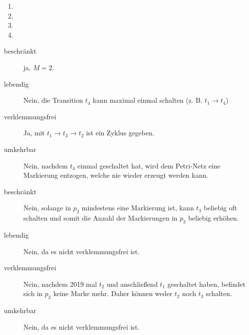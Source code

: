 \documentclass{lehramt-informatik-aufgabe}
\begin{document}
\begin{enumerate}
\item {}
\item {}
\item {}
\item {}

\end{enumerate}

\begin{antwort}


\tikzset{/petri/.cd,x=2,y=2,scale=0.45}

\noindent
{}
%
%
%

\begin{description}
\item[beschränkt] ja, $M = 2$.

\item[lebendig] Nein, die Transition $t_4$ kann maximal einmal schalten
(z. B. $t_1 \rightarrow t_4$)

\item[verklemmungsfrei] Ja, mit $t_1 \rightarrow t_3 \rightarrow  t_2$
ist ein Zyklus gegeben.

\item[umkehrbar] Nein, nachdem $t_4$ einmal geschaltet hat, wird dem
Petri-Netz eine Markierung entzogen, welche nie wieder erzeugt werden
kann.
\end{description}


\begin{description}
\item[beschränkt] Nein, solange in $p_2$ mindestens eine Markierung ist,
kann $t_3$ beliebig oft schalten und somit die Anzahl der Markierungen
in $p_3$ beliebig erhöhen.

\item[lebendig] Nein, da es nicht verklemmungsfrei ist.

\item[verklemmungsfrei] Nein, nachdem 2019 mal $t_2$ und anschließend
$t_1$ geschaltet haben, befindet sich in $p_2$ keine Marke mehr. Daher
können weder $t_2$ noch $t_3$ schalten.

\item[umkehrbar]
Nein, da es nicht verklemmungsfrei ist.
\end{description}


\end{antwort}
\end{document}
